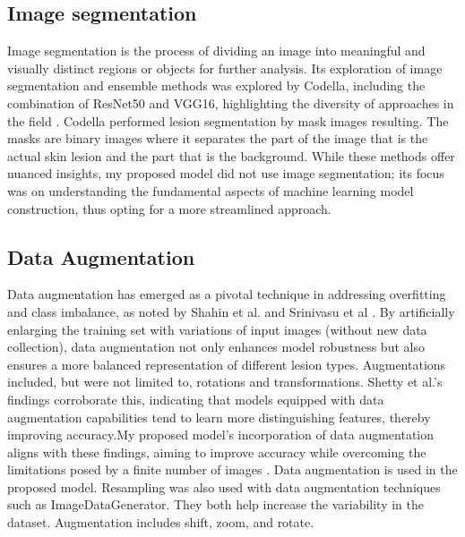 \documentclass[10pt,twocolumn]{article}
\begin{document}
\subsection{Image segmentation}
Image segmentation is the process of dividing an image into meaningful and visually distinct regions or objects for further analysis. Its exploration of image segmentation and ensemble methods was explored by Codella, including the combination of ResNet50 and VGG16, highlighting the diversity of approaches in the field \cite{codella2018skin}. \newline
Codella performed lesion segmentation by mask images resulting. The masks are binary images where it separates the part of the image that is the actual skin lesion and the part that is the background. While these methods offer nuanced insights, my proposed model did not use image segmentation; its focus was on understanding the fundamental aspects of machine learning model construction, thus opting for a more streamlined approach.

\subsection{Data Augmentation}
Data augmentation has emerged as a pivotal technique in addressing overfitting and class imbalance, as noted by Shahin et al. and Srinivasu et al \cite{shahin2018deep} \cite{srinivasu2021classification}. By artificially enlarging the training set with variations of input images (without new data collection), data augmentation not only enhances model robustness but also ensures a more balanced representation of different lesion types. Augmentations included, but were not limited to, rotations and transformations. \newline \newline
Shetty et al.'s findings corroborate this, indicating that models equipped with data augmentation capabilities tend to learn more distinguishing features, thereby improving accuracy.My proposed model's incorporation of data augmentation aligns with these findings, aiming to improve accuracy while overcoming the limitations posed by a finite number of images \cite{shetty2022skin}. \newline \newline
Data augmentation is used in the proposed model. Resampling was also used with data augmentation techniques such as ImageDataGenerator. They both help increase the variability in the dataset. Augmentation includes shift, zoom, and rotate.
\end{document}
